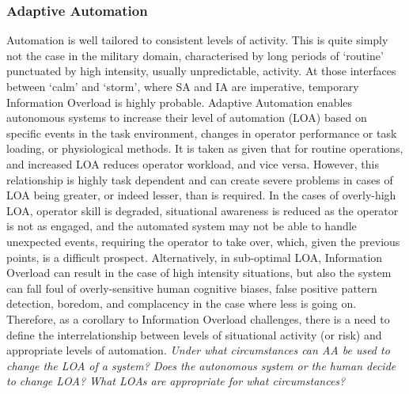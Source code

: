 \subsubsection{Adaptive Automation}
Automation is well tailored to consistent levels of activity.
This is quite simply not the case in the military domain, characterised by long periods of ‘routine’ punctuated by high intensity, usually unpredictable, activity.
At those interfaces between ‘calm’ and ‘storm’, where SA and IA are imperative, temporary Information Overload is highly probable.
Adaptive Automation enables autonomous systems to increase their level of automation (LOA) based on specific events in the task environment, changes in operator performance or task loading, or physiological methods. 
It is taken as given that for routine operations, and increased LOA reduces operator workload, and vice versa.
However, this relationship is highly task dependent and can create severe problems in cases of LOA being greater, or indeed lesser, than is required. 
In the cases of overly-high LOA, operator skill is degraded, situational awareness is reduced as the operator is not as engaged, and the automated system may not be able to handle unexpected events, requiring the operator to take over, which, given the previous points, is a difficult prospect.
Alternatively, in sub-optimal LOA, Information Overload can result in the case of high intensity situations, but also the system can fall foul of overly-sensitive human cognitive biases, false positive pattern detection, boredom, and complacency in the case where less is going on.
Therefore, as a corollary to Information Overload challenges, there is a need to define the interrelationship between levels of situational activity (or risk) and appropriate levels of automation. 
\textit{Under what circumstances can AA be used to change the LOA of a system? Does the autonomous system or the human decide to change LOA? What LOAs are appropriate for what circumstances?}


